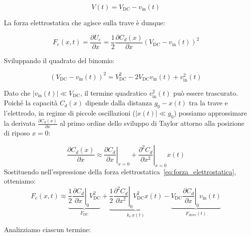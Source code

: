 \documentclass[11pt,a4paper]{article}
\begin{document}
\begin{equation}
    V(t) = V_{\text{DC}} - v_{\text{in}}(t)
\end{equation}

\noindent La forza elettrostatica che agisce sulla trave è dunque:

\begin{equation}
    \label{eq:forza_elettrostatica}
    F_e(x, t) = \frac{\partial U_e}{\partial x} = \frac{1}{2} \frac{\partial C_d(x)}{\partial x} \left( V_{\text{DC}} - v_{\text{in}}(t) \right)^2
\end{equation}

\noindent Sviluppando il quadrato del binomio:

\begin{equation}
    \left( V_{\text{DC}} - v_{\text{in}}(t) \right)^2 = V_{\text{DC}}^2 - 2 V_{\text{DC}} v_{\text{in}}(t) + v_{\text{in}}^2(t)
\end{equation}

\noindent Dato che $|v_{\text{in}}(t)| \ll V_{\text{DC}}$, il termine quadratico $v_{\text{in}}^2(t)$ può essere trascurato. Poiché la capacità $C_d(x)$ dipende dalla distanza $g_0 - x(t)$ tra la trave e l'elettrodo, in regime di piccole oscillazioni ($|x(t)| \ll g_0$) possiamo approssimare la derivata $\frac{\partial C_d(x)}{\partial x}$ al primo ordine dello sviluppo di Taylor attorno alla posizione di riposo $x = 0$:

\begin{equation}
    \frac{\partial C_d(x)}{\partial x} \approx \left. \frac{\partial C_d}{\partial x} \right|_{x=0} + \left. \frac{\partial^2 C_d}{\partial x^2} \right|_{x=0} x(t)
\end{equation}
\noindent Sostituendo nell'espressione della forza elettrostatica~\eqref{eq:forza_elettrostatica}, otteniamo:
\begin{equation}
    F_e(x, t) \approx \underbrace{\frac{1}{2} \left. \frac{\partial C_d}{\partial x} \right|_0 V_{\text{DC}}^2}_{F_{\text{DC}}} + \underbrace{\frac{1}{2} \left. \frac{\partial^2 C_d}{\partial x^2} \right|_0 V_{\text{DC}}^2 x(t)}_{k_e \, x(t)} - \underbrace{V_{\text{DC}} \left. \frac{\partial C_d}{\partial x} \right|_0 v_{\text{in}}(t)}_{F_{\text{drive}}(t)}
\end{equation}

\noindent Analizziamo ciascun termine:
\end{document}
